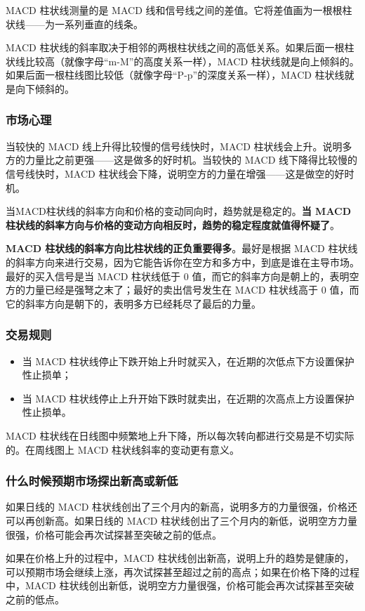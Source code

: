 MACD 柱状线测量的是 MACD 线和信号线之间的差值。它将差值画为一根根柱状线——为一系列垂直的线条。

MACD 柱状线的斜率取决于相邻的两根柱状线之间的高低关系。如果后面一根柱状线比较高（就像字母“m-M”的高度关系一样），MACD 柱状线就是向上倾斜的。如果后面一根柱线图比较低（就像字母“P-p”的深度关系一样），MACD 柱状线就是向下倾斜的。
\subsubsection*{市场心理}
当较快的 MACD 线上升得比较慢的信号线快时，MACD 柱状线会上升。说明多方的力量比之前更强——这是做多的好时机。当较快的 MACD 线下降得比较慢的信号线快时，MACD 柱状线会下降，说明空方的力量在增强——这是做空的好时机。

当MACD柱状线的斜率方向和价格的变动同向时，趋势就是稳定的。\textbf{当 MACD 柱状线的斜率方向与价格的变动方向相反时，趋势的稳定程度就值得怀疑了}。

\textbf{MACD 柱状线的斜率方向比柱状线的正负重要得多}。最好是根据 MACD 柱状线的斜率方向来进行交易，因为它能告诉你在空方和多方中，到底是谁在主导市场。最好的买入信号是当 MACD 柱状线低于 0 值，而它的斜率方向是朝上的，表明空方的力量已经是强弩之末了；最好的卖出信号发生在 MACD 柱状线高于 0 值，而它的斜率方向是朝下的，表明多方已经耗尽了最后的力量。
\subsubsection*{交易规则}
\begin{itemize}
    \item 当 MACD 柱状线停止下跌开始上升时就买入，在近期的次低点下方设置保护性止损单；
    \item 当 MACD 柱状线停止上升开始下跌时就卖出，在近期的次高点上方设置保护性止损单。
\end{itemize}

MACD 柱状线在日线图中频繁地上升下降，所以每次转向都进行交易是不切实际的。在周线图上 MACD 柱状线斜率的变动更有意义。
\subsubsection*{什么时候预期市场探出新高或新低}
如果日线的 MACD 柱状线创出了三个月内的新高，说明多方的力量很强，价格还可以再创新高。如果日线的 MACD 柱状线创出了三个月内的新低，说明空方力量很强，价格可能会再次试探甚至突破之前的低点。

如果在价格上升的过程中，MACD 柱状线创出新高，说明上升的趋势是健康的，可以预期市场会继续上涨，再次试探甚至超过之前的高点；如果在价格下降的过程中，MACD 柱状线创出新低，说明空方力量很强，价格可能会再次试探甚至突破之前的低点。

